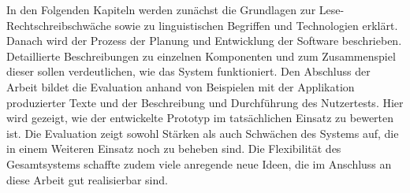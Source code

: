 In den Folgenden Kapiteln werden zunächst die Grundlagen zur Lese-Rechtschreibschwäche sowie zu linguistischen Begriffen und Technologien erklärt. Danach wird der Prozess der Planung und Entwicklung der Software beschrieben. Detaillierte Beschreibungen zu einzelnen Komponenten und zum Zusammenspiel dieser sollen verdeutlichen, wie das System funktioniert. Den Abschluss der Arbeit bildet die Evaluation anhand von Beispielen mit der Applikation produzierter Texte und der Beschreibung und Durchführung des Nutzertests. Hier wird gezeigt, wie der entwickelte Prototyp im tatsächlichen Einsatz zu bewerten ist. Die Evaluation zeigt sowohl Stärken als auch Schwächen des Systems auf, die in einem Weiteren Einsatz noch zu beheben sind. Die Flexibilität des Gesamtsystems schaffte zudem viele anregende neue Ideen, die im Anschluss an diese Arbeit gut realisierbar sind.